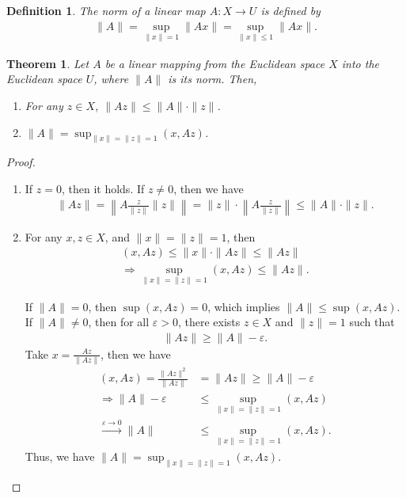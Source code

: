 \documentclass[11pt]{book}
\newtheorem{definition}{Definition}[section]
\newtheorem{theorem}{Theorem}[section]
\theoremstyle{definition}
\numberwithin{equation}{subsection}
\begin{document}
\begin{definition}
The norm of a linear map $A:X\to U$ is defined by
\begin{align*}
    \|A\| = \sup_{\|x\| = 1} \|Ax\| = \sup_{\|x\| \leq 1} \|Ax\|.
\end{align*}
\end{definition}

\medskip

\begin{theorem}
Let $A$ be a linear mapping from the Euclidean space $X$ into the
Euclidean space $U$, where $\|A\|$ is its norm. Then, 
\begin{enumerate}[label=(\roman*)]
    \item For any $z\in X$, $\|Az\|\leq \|A\|\cdot \|z\|$.
    \item $\|A\| = \sup_{\|x\| = \|z\| = 1} (x, Az)$.
\end{enumerate}
\end{theorem}
\begin{proof}
~\begin{enumerate}[label=(\roman*)]
    \item If $z = 0$, then it holds. If $z\neq 0$, then we have 
    \begin{align*}
        \|Az\| = \left\|A \frac{z}{\|z\|}\|z\|\right\| = \|z\|\cdot \left\|A \frac{z}{\|z\|}\right\| \leq \|A\|\cdot \|z\|.
    \end{align*}
    \item For any $x,z\in X$, and $\|x\| = \|z\| = 1$, then 
    \begin{align*}
        (x, Az) \leq \|x\| \cdot \|Az\| \leq \|Az\| \\
        \Rightarrow \sup_{\|x\| = \|z\| = 1} (x, Az) \leq \|Az\|.
    \end{align*}
    
    If $\|A\| = 0$, then $\sup (x, Az) = 0$, which implies $\|A\| \leq \sup (x, Az)$. If $\|A\| \neq 0$, then for all $\varepsilon > 0$, there exists $z \in X$ and $\|z\| = 1$ such that 
    \begin{align*}
        \|Az\| \geq \|A\| - \varepsilon.
    \end{align*}
    Take $x = \frac{Az}{\|Az\|}$, then we have 
    \begin{align*}
        (x, Az) = \frac{\|Az\|^2}{\|Az\|} & = \|Az\| \geq \|A\| - \varepsilon \\
        \Rightarrow \|A\| - \varepsilon & \leq \sup_{\|x\| = \|z\| = 1} (x, Az) \\
        \xrightarrow{\varepsilon \to 0} \|A\| & \leq \sup_{\|x\| = \|z\| = 1} (x, Az).
    \end{align*}
    Thus, we have $\|A\| = \sup_{\|x\| = \|z\| = 1} (x, Az)$.
\end{enumerate}
\end{proof}
\end{document}
